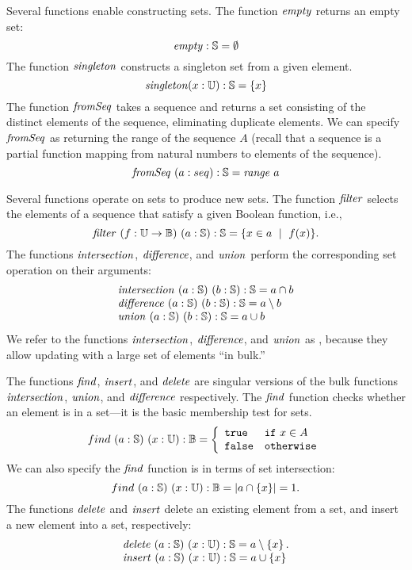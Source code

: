\begin{gram}
Several functions enable constructing sets.
%
The function $\mathit{empty}$ returns an empty set:
%
\[
\mathit{empty} : {\mathbb{S}} = \emptyset
\]
%
The function $\mathit{singleton}$ constructs a singleton set from a given
element.
%
\[
\mathit{singleton} (x : {\mathbb{U}}) : {\mathbb{S}} = \{x \}
\]
%
The function $\mathit{fromSeq}$ takes a sequence and returns a set consisting of the
distinct elements of the sequence, eliminating duplicate elements.
%
We can specify $\mathit{fromSeq}$ as returning the range of the sequence
$A$ (recall that a sequence is a partial function mapping from natural numbers
to elements of the sequence).
%
\[
\mathit{fromSeq}~(a : seq) : {\mathbb{S}} = \mathit{range}~a
\]
%
\end{gram}

\begin{gram}
%
Several functions operate on sets to produce new sets.
%
The function $\mathit{filter}$ selects the elements of a sequence that
satisfy a given Boolean function, i.e., 
%
\[
\mathit{filter}~(f : {\mathbb{U}} \rightarrow \mathbb{B})~(a : {\mathbb{S}}) : {\mathbb{S}} = \{ x \in a ~\mid~ f(x)\} .
\]
%
The functions $\mathit{intersection}$, $\mathit{difference}$, and $\mathit{union}$
perform the corresponding set operation on their arguments:
%
\[
\begin{array}{l}
\mathit{intersection}~(a : {\mathbb{S}})~(b : {\mathbb{S}}) : {\mathbb{S}} = a \cap b\\
\mathit{difference}~(a  : {\mathbb{S}})~(b : {\mathbb{S}}) : {\mathbb{S}} = a \setminus b\\
\mathit{union}~(a : {\mathbb{S}})~(b : {\mathbb{S}}) : {\mathbb{S}} = a \cup b
\end{array}
\]
%
We refer to the functions  $\mathit{intersection}$, $\mathit{difference}$, and $\mathit{union}$
as , because they allow updating with a large set
of elements ``in bulk.''
\end{gram}

\begin{gram}
The functions $\mathit{find}$, $\mathit{insert}$, and $\mathit{delete}$ are singular
versions of the bulk functions $\mathit{intersection}$, $\mathit{union}$, and
$\mathit{difference}$ respectively.
%
The $\mathit{find}$ function checks whether an element is in a set---it is
the basic membership test for sets.
%
\[
find~(a  : {\mathbb{S}})~(x : {\mathbb{U}}) : \mathbb{B} = \left\{
                \begin{array}{ll}
                \texttt{true} & \texttt{if}~x \in A \\
                \texttt{false} & \texttt{otherwise}
                \end{array} \right.
\]
%
We can also specify the $\mathit{find}$ function is in terms of set
intersection:
\[
find~(a : {\mathbb{S}})~(x : {\mathbb{U}}) : \mathbb{B} = |{a \cap \left\{ x \right\}}| = 1.
\]
%
The functions $\mathit{delete}$ and $\mathit{insert}$ 
%
delete an existing element from a set, and
%
insert a new element into a set,
%
respectively:
%
\[
\begin{array}{l}
\mathit{delete}~(a  : {\mathbb{S}})~(x  : {\mathbb{U}}) : {\mathbb{S}} = a \setminus \left\{ x \right\}.\\
\mathit{insert}~(a : {\mathbb{S}})~(x : {\mathbb{U}}) : {\mathbb{S}} = a \cup \left\{ x \right\}
\end{array}
\]
%
\end{gram}

